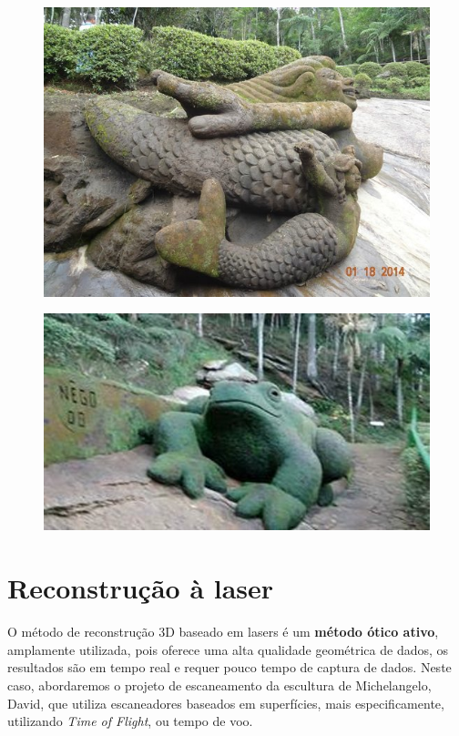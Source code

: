 \documentclass[table, usenames, svgnames, xcolor=dvipsnames]{beamer}
\begin{document}
\begin{frame} 
	\begin{figure}[!h]
		\centering
		\includegraphics[width=0.7\linewidth]{figs/jardim-do-nego22.jpg}
	\end{figure}
\end{frame}


\begin{frame} 
	\begin{figure}[!h]
		\centering
		\includegraphics[width=0.7\linewidth]{figs/jardim-do-nego32.jpg}
	\end{figure}
\end{frame}


\section{Reconstrução à laser}

\begin{frame} 
	\begin{center}
	O método de reconstrução 3D baseado em lasers é um \textbf{método ótico ativo}, amplamente utilizada, pois oferece uma alta qualidade geométrica de dados, os resultados são em tempo real e requer pouco tempo de captura de dados.
Neste caso, abordaremos o projeto de escaneamento da escultura de Michelangelo, David, que utiliza escaneadores baseados em superfícies, mais especificamente, utilizando \emph{Time of Flight}, ou tempo de voo.
	\end{center}
\end{frame}
\end{document}
